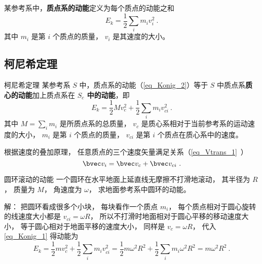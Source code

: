 

某参考系中，\textbf{质点系的动能}定义为每个质点的动能之和
\begin{equation}\label{eq_Konig_2}
E_k = \frac12 \sum_i m_i v_{i}^2 ~.
\end{equation}
其中 $m_i$ 是第 $i$ 个质点的质量， $v_i$ 是其速度的大小。

\subsection{柯尼希定理}

\begin{theorem}{柯尼希定理}
某参考系 $S$ 中，质点系的动能（\autoref{eq_Konig_2}）等于 $S$ 中质点系\textbf{质心的动能}加上质点系在\textbf{ $S_c$ 中的动能}，即
\begin{equation}\label{eq_Konig_1}
E_k = \frac12 Mv_c^2 + \frac12 \sum_i m_i v_{ci}^2 ~.
\end{equation}
其中 $M=\sum_i m_i$ 是所质点系的总质量， $v_c$ 是质心系相对于当前参考系的运动速度的大小， $m_i$ 是第 $i$ 个质点的质量， $v_{ci}$ 是第 $i$ 个质点在质心系中的速度。
\end{theorem}
根据速度的叠加原理， 任意质点的三个速度矢量满足关系（\autoref{eq_Vtrans_1}~）
\begin{equation}
\bvec v_i = \bvec v_c + \bvec v_{ci}~.
\end{equation}

\begin{example}{圆环滚动的动能}
一个圆环在水平地面上延直线无摩擦不打滑地滚动， 其半径为 $R$， 质量为 $M$， 角速度为 $\omega$， 求地面参考系中圆环的动能。

解： 把圆环看成很多个小块， 每块看作一个质点 $m_i$， 每个质点相对于圆心旋转的线速度大小都是 $v_{ci} = \omega R$， 所以不打滑时地面相对于圆心平移的移动速度大小， 等于圆心相对于地面平移的速度大小， 同样是 $v_c = \omega R$， 代入\autoref{eq_Konig_1} 得动能为
\begin{equation}
E_k = \frac12 m v_c^2 + \frac12 \sum_i m_i v_{ci}^2 = \frac12 m\omega^2 R^2 + \frac12 \sum_i m_i \omega^2 R^2 = m\omega^2 R^2~.
\end{equation}
\end{example}

